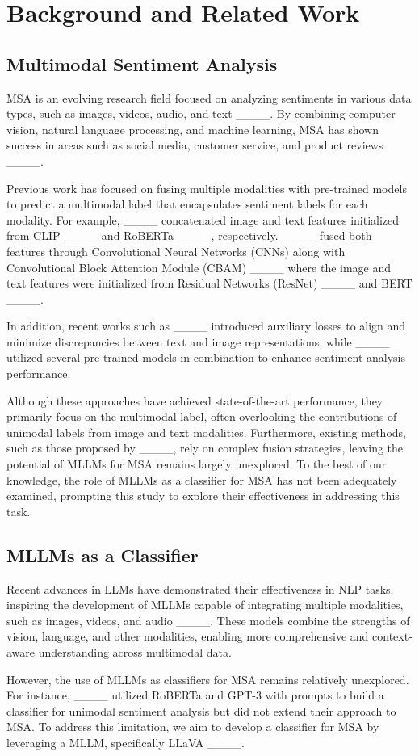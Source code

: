\section{Background and Related Work}
\subsection{Multimodal Sentiment Analysis}
MSA is an evolving research field focused on analyzing sentiments in various data types, such as images, videos, audio, and text ____. By combining computer vision, natural language processing, and machine learning, MSA has shown success in areas such as social media, customer service, and product reviews ____.

Previous work has focused on fusing multiple modalities with pre-trained models to predict a multimodal label that encapsulates sentiment labels for each modality. For example, ____ concatenated image and text features initialized from CLIP ____ and RoBERTa ____, respectively. ____ fused both features through Convolutional Neural Networks (CNNs) along with Convolutional Block Attention Module (CBAM) ____ where the image and text features were initialized from Residual Networks (ResNet) ____ and BERT ____. 

In addition, recent works such as ____ introduced auxiliary losses to align and minimize discrepancies between text and image representations, while ____ utilized several pre-trained models in combination to enhance sentiment analysis performance.

Although these approaches have achieved state-of-the-art performance, they primarily focus on the multimodal label, often overlooking the contributions of unimodal labels from image and text modalities. Furthermore, existing methods, such as those proposed by ____, rely on complex fusion strategies, leaving the potential of MLLMs for MSA remains largely unexplored. To the best of our knowledge, the role of MLLMs as a classifier for MSA has not been adequately examined, prompting this study to explore their effectiveness in addressing this task.

\subsection{MLLMs as a Classifier}
Recent advances in LLMs have demonstrated their effectiveness in NLP tasks, inspiring the development of MLLMs capable of integrating multiple modalities, such as images, videos, and audio ____. These models combine the strengths of vision, language, and other modalities, enabling more comprehensive and context-aware understanding across multimodal data. 

However, the use of MLLMs as classifiers for MSA remains relatively unexplored. For instance, ____ utilized RoBERTa and GPT-3 with prompts to build a classifier for unimodal sentiment analysis but did not extend their approach to MSA. To address this limitation, we aim to develop a classifier for MSA by leveraging a MLLM, specifically LLaVA ____.